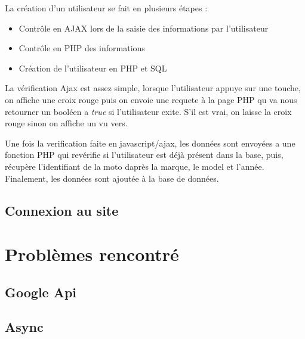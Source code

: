 \documentclass[a4paper]{article}
\newcommand{\rpi}{\emph{Raspbery Pi}}
\begin{document}
La création d'un utilisateur se fait en plusieurs étapes :
\begin{itemize}
    \item Contrôle en AJAX lors de la saisie des informations par l'utilisateur
    \item Contrôle en PHP des informations
    \item Création de l'utilisateur en PHP et SQL
\end{itemize}

La vérification Ajax est assez simple, lorsque l'utilisateur appuye sur une touche, on affiche une croix rouge puis on envoie une requete à la page PHP qu va nous retourner un booléen a \emph{true} si l'utilisateur exite. S'il est vrai, on laisse la croix rouge sinon on affiche un vu vers.


Une fois la verification faite en javascript/ajax, les données sont envoyées a une fonction PHP qui revérifie si l'utilisateur est déjà présent dans la base, puis, récupère l'identifiant de la moto daprès la marque, le model et l'année.
Finalement, les données sont ajoutée à la base de données.



\subsection{Connexion au site}

\pagebreak

\section{Problèmes rencontré}
\subsection{Google Api}
\subsection{Async}

\end{document}
